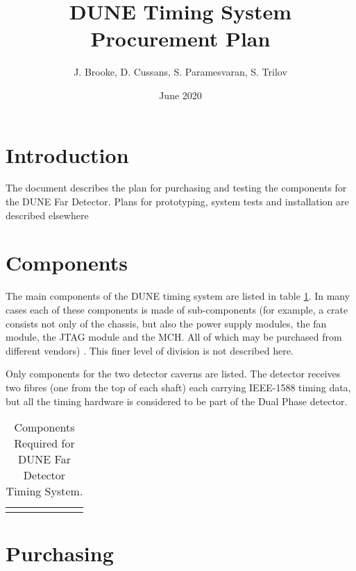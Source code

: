 \documentclass{article}
\title{DUNE Timing System Procurement Plan}
\author{J. Brooke, D. Cussans, S. Paramesvaran, S. Trilov}
\date{June 2020}
\begin{document}
\linenumbers
\maketitle

\tableofcontents

\section*{Introduction} 
\label{sec:intro}
The document describes the plan for purchasing and testing the components for the DUNE Far Detector. Plans for prototyping, system tests and installation are described elsewhere\cite{ref:dts-system-tests,ref:dune-installation-schedule} 

\section{Components}

The main components of the DUNE timing system are listed in table \ref{tab:dts-components}. In many cases each of these components is made of sub-components (for example, a  crate consists not only of the chassis, but also the power supply modules, the fan module, the JTAG module and the MCH. All of which may be purchased from different vendors) . This finer level of division is not described here.

Only components for the two  detector caverns are listed. The  detector receives two fibres (one from the top of each shaft) each carrying IEEE-1588 timing data, but all the timing hardware is considered to be part of the Dual Phase detector.

\begin{table}[h!]
\begin{tabular}{p{2.2cm}  |p{1.5cm}| p{1.3cm}| p{1.3cm} |p{1.3cm} |p{1.5cm} |p{1.3cm} }
\end{tabular}
\caption{Components Required for DUNE Far Detector Timing System.}
\label{tab:dts-components}
\end{table}


\section{Purchasing}
\end{document}
